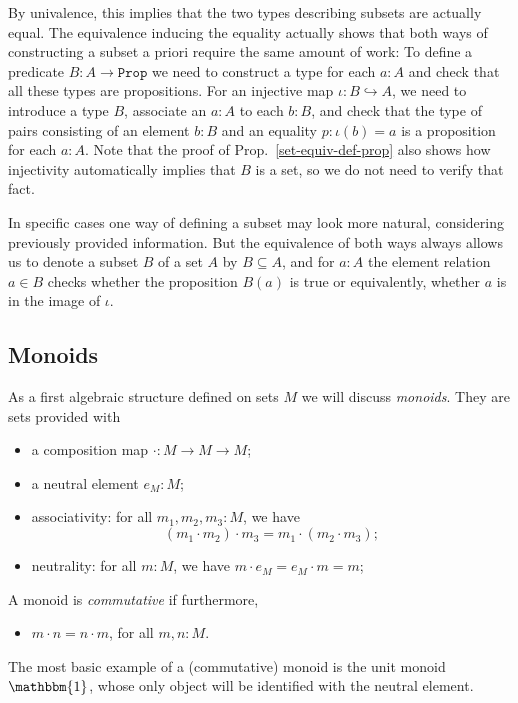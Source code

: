 \documentclass{amsart}
\theoremstyle{plain}
\numberwithin{equation}{section} %
\numberwithin{figure}{section} %
\theoremstyle{plain}
\theoremstyle{plain}
\theoremstyle{plain}
\theoremstyle{plain}
\theoremstyle{plain}
\theoremstyle{plain}
\theoremstyle{remark}
\theoremstyle{remark}
\theoremstyle{remark}
\begin{document}
By univalence, this implies that the two types describing subsets are actually equal. The equivalence inducing the equality actually shows that both ways of constructing a subset a priori require the same amount of work: To define a predicate $B : A \rightarrow \mathtt{Prop}$ we need to construct a type for each $a : A$ and check that all these types are propositions. For an injective map $\iota : B \hookrightarrow A$, we need to introduce a type $B$, associate an $a : A$ to each $b : B$, and check that the type of pairs consisting of an element $b : B$ and an equality $p : \iota(b) = a$ is a proposition for each $a : A$. Note that the proof of Prop.~\ref{set-equiv-def-prop} also shows how injectivity automatically implies that $B$ is a set, so we do not need to verify that fact. 

In specific cases one way of defining a subset may look more natural, considering previously provided information. But the equivalence of both ways
always allows us to denote a subset $B$ of a set $A$ by $B \subseteq A$, and for $a : A$ the element relation $a \in B$ checks whether the proposition $B(a)$ is true or equivalently, whether $a$ is in the image of $\iota$.


\subsection{Monoids}  \label{monoid-ssec}

As a first algebraic structure defined on sets $M$ we will discuss \textit{monoids}. They are sets provided with
\begin{itemize}
\item a composition map $\cdot : M \rightarrow M \rightarrow M$;
\item a neutral element $e_M : M$;
\item associativity: for all $m_1, m_2, m_3 : M$, we have 
\[ (m_1 \cdot m_2) \cdot m_3 = m_1 \cdot (m_2 \cdot m_3); \]
\item neutrality: for all $m : M$, we have $m \cdot e_M = e_M \cdot m = m$;
\end{itemize}

A monoid is \textit{commutative} if furthermore,
\begin{itemize}
\item $m \cdot n = n \cdot m$, for all $m, n : M$.
\end{itemize}
The most basic example of a (commutative) monoid is the unit monoid $\mathbbm{1}$, whose only object will be identified with the neutral element.
\end{document}
